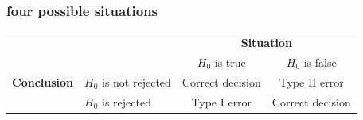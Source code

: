 \documentclass[xcolor={table}]{beamer}
\begin{document}

\begin{frame}\frametitle{four possible situations}\footnotesize
\begin{tabular}{cl|c|c|}
  &  \multicolumn{1}{c}{}& \multicolumn{2}{c}{\textbf{Situation}} \\
  &  \multicolumn{1}{c}{}& \multicolumn{1}{c}{$H_0$ is true} & \multicolumn{1}{c}{$H_0$ is false} \\
\cline{3-4}
\textbf{Conclusion} & $H_0$ is not rejected &  Correct decision  & Type II error \\
\cline{3-4}
 & $H_0$ is rejected & Type I error &  Correct decision  \\
\cline{3-4}
\end{tabular}
\end{frame}
\end{document}
